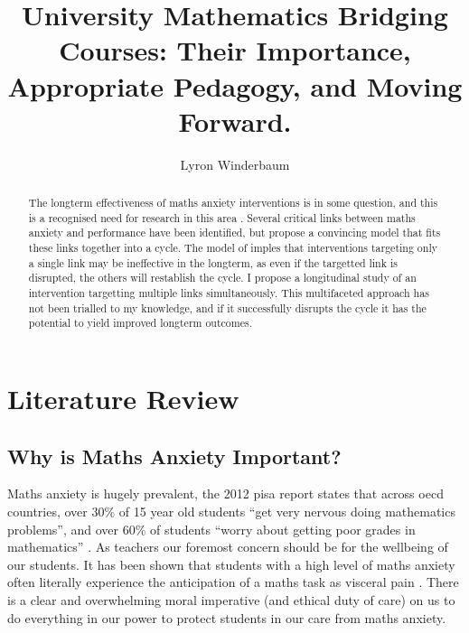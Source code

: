 \documentclass[twoside,12pt,a4paper]{report}
\title{University Mathematics Bridging Courses: Their Importance, Appropriate Pedagogy, and Moving Forward.}
\author{Lyron Winderbaum}
\begin{document}
\maketitle



\begin{abstract}

The longterm effectiveness of maths anxiety interventions is in some question, and this is a recognised need for research in this area \cite{Pellicioni2016,Chang2016}. Several critical links between maths anxiety and performance have been identified, but  propose a convincing model that fits these links together into a cycle. The model of  imples that interventions targeting only a single link may be ineffective in the longterm, as even if the targetted link is disrupted, the others will restablish the cycle. I propose a longitudinal study of an intervention targetting multiple links simultaneously. This multifaceted approach has not been trialled to my knowledge, and if it successfully disrupts the cycle it has the potential to yield improved longterm outcomes.

\end{abstract}


\pagebreak
\glsresetall
\section{Literature Review}


\subsection*{Why is Maths Anxiety Important?}

Maths anxiety is hugely prevalent, the 2012 \gls{pisa} report states that across \gls{oecd} countries, over 30\% of 15 year old students ``get very nervous doing mathematics problems'', and over 60\% of students ``worry about getting poor grades in mathematics''  \cite{PISA2013}. As teachers our foremost concern should be for the wellbeing of our students. It has been shown that students with a high level of maths anxiety often literally experience the anticipation of a maths task as visceral pain \cite{Lyons2012pain}. There is a clear and overwhelming moral imperative (and ethical duty of care) on us to do everything in our power to protect students in our care from maths anxiety.
\end{document}
